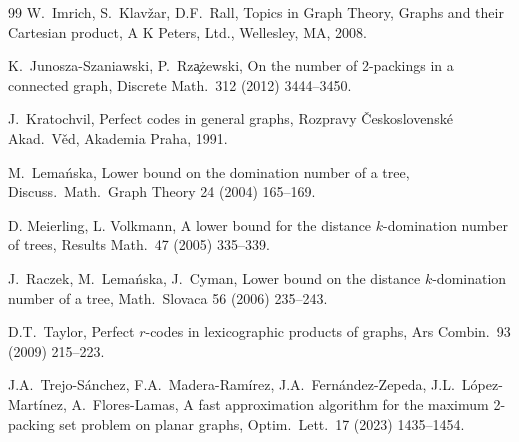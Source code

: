 \documentclass[12pt]{article}
\begin{document}
\begin{thebibliography}{99}
W.~Imrich, S.~Klav\v{z}ar, D.F.~Rall,
Topics in Graph Theory, Graphs and their Cartesian product,
A K Peters, Ltd., Wellesley, MA, 2008.

K.~Junosza-Szaniawski, P.~Rz\c a\.zewski,
On the number of 2-packings in a connected graph,
Discrete Math.\ 312 (2012) 3444--3450.

J.~Kratochvil, Perfect codes in general graphs, Rozpravy \v{C}eskoslovensk\'e Akad.\ V\v{e}d, Akademia Praha, 1991.

M.~Lema\'nska, 
Lower bound on the domination number of a tree, 
Discuss.\ Math.\ Graph Theory 24 (2004) 165--169.

D. Meierling, L. Volkmann, 
A lower bound for the distance $k$-domination number of trees,
Results Math.\ 47 (2005) 335--339.

J.~Raczek, M.~Lema\'nska, J.~Cyman, 
Lower bound on the distance {$k$}-domination number of a tree,
Math.\ Slovaca 56 (2006) 235--243. 

D.T.~Taylor, 
Perfect $r$-codes in lexicographic products of graphs,
Ars Combin.\ 93 (2009) 215--223.

J.A.~Trejo-S\'anchez, F.A.~Madera-Ram\'irez, J.A.~Fern\'andez-Zepeda, J.L.~L\'opez-Mart\'inez, A.~Flores-Lamas, 
A fast approximation algorithm for the maximum 2-packing set problem on planar graphs,
Optim.\ Lett.\ 17 (2023) 1435--1454.

\end{thebibliography}
\end{document}
